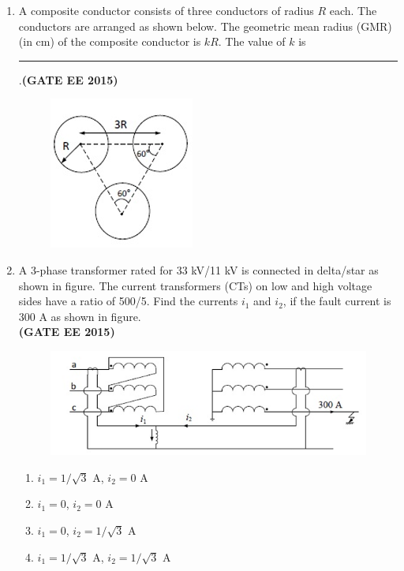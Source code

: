 \documentclass[a4paper,12pt]{exam}
\theoremstyle{remark}
\begin{document}
\begin{enumerate}
\item A composite conductor consists of three conductors of radius $R$ each. The conductors are arranged as shown below. The geometric mean radius (GMR) (in cm) of the composite conductor is $kR$. The value of $k$ is \rule{3cm}{0.15mm}.\hfill{\textbf{(GATE EE 2015)}}
\begin{figure}[H]
    \centering
    \includegraphics[width=0.4\columnwidth]{figs/2Q 51.png}
    \caption{}
    \label{fig:placeholder}
\end{figure}
\item A 3-phase transformer rated for 33 kV/11 kV is connected in delta/star as shown in figure. The current transformers (CTs) on low and high voltage sides have a ratio of 500/5. Find the currents $i_1$ and $i_2$, if the fault current is 300 A as shown in figure.\\\hfill{\textbf{(GATE EE 2015)}}
\begin{figure}[H]
    \centering
    \includegraphics[width=0.8\columnwidth]{figs/2Q 52.png}
    \caption{}
    \label{fig:placeholder}
\end{figure}
\begin{multicols}{2}
     \begin{enumerate}
        \item $i_1 = 1/\sqrt{3}$ A, $i_2 = 0$ A
        \item $i_1 = 0$, $i_2 = 0$ A
        \item $i_1 = 0$, $i_2 = 1/\sqrt{3}$ A
        \item $i_1 = 1/\sqrt{3}$ A, $i_2 = 1/\sqrt{3}$ A
    \end{enumerate}
\end{multicols}
   


\end{enumerate}
\end{document}

